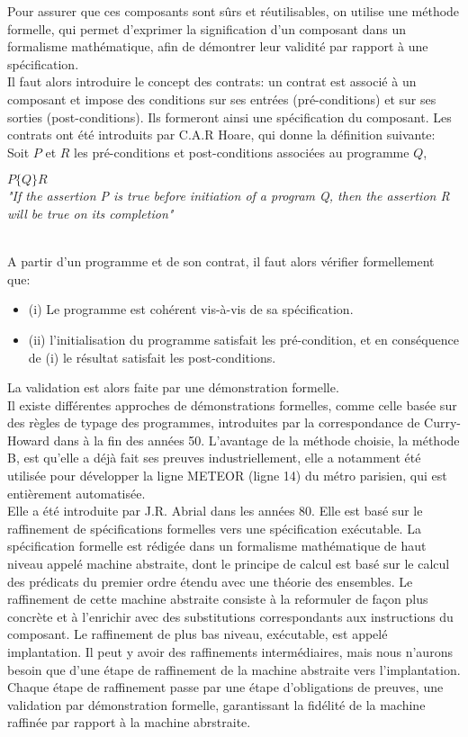 Pour assurer que ces composants sont sûrs et réutilisables, on
utilise une méthode formelle, qui permet d'exprimer la signification d'un
composant dans un formalisme mathématique, afin de démontrer leur
validité par rapport à une spécification.\\
Il faut alors introduire le concept des contrats: un contrat est
associé à un composant et impose des conditions sur ses entrées
(pré-conditions) et sur ses sorties (post-conditions). Ils formeront
ainsi une spécification du composant. Les contrats
ont été introduits par C.A.R Hoare, qui donne la définition
suivante: Soit $P$ et $R$ les pré-conditions et post-conditions associées au
programme $Q$, \\
\begin{minipage}{\textwidth}
\begin{center}
$P\{Q\}R$ \\
\emph{"If the assertion P is true before initiation of a program Q, then the
assertion R will be true on its completion"}
\end{center}
\end{minipage}
\\
A partir d'un programme et de son contrat, il faut alors vérifier formellement
que: 
\begin{itemize}
\item  (i) Le programme est cohérent vis-à-vis de sa spécification.
\item (ii) l'initialisation du programme satisfait les pré-condition, et en
conséquence de (i) le résultat satisfait les post-conditions.
\end{itemize}
La validation est alors faite par une démonstration formelle.\\

Il existe différentes approches de démonstrations formelles, comme celle basée
sur des règles de typage des programmes, introduites par la correspondance de
Curry-Howard dans à la fin des années 50. 
L'avantage de la méthode choisie, la méthode B, est qu'elle a déjà
fait ses preuves industriellement, elle a notamment été utilisée pour
développer la ligne METEOR (ligne 14) du métro parisien, qui est
entièrement automatisée.\\ 
Elle a été introduite
par J.R. Abrial dans les années 80. Elle est basé sur le raffinement de
spécifications formelles vers une spécification exécutable. La spécification
formelle est rédigée dans un formalisme mathématique de haut niveau appelé
machine abstraite, dont le principe de calcul est basé sur le calcul
des prédicats du premier ordre étendu avec une théorie des
ensembles. Le raffinement de cette machine abstraite consiste à la
reformuler de façon plus concrète et à l'enrichir avec des
substitutions correspondants aux instructions du composant. Le
raffinement de plus bas niveau, exécutable, est appelé implantation. Il peut y
avoir des raffinements intermédiaires, mais nous n'aurons besoin que
d'une étape de raffinement de la machine abstraite vers l'implantation. Chaque
étape de raffinement passe par une étape d'obligations de preuves, une
validation par démonstration formelle, garantissant la fidélité de la
machine raffinée par rapport à la machine abrstraite. \\

